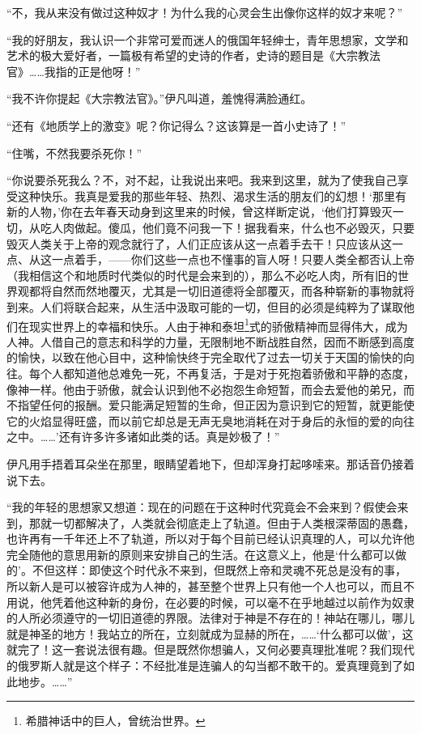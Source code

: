 \par “不，我从来没有做过这种奴才！为什么我的心灵会生出像你这样的奴才来呢？”
\par “我的好朋友，我认识一个非常可爱而迷人的俄国年轻绅士，青年思想家，文学和艺术的极大爱好者，一篇极有希望的史诗的作者，史诗的题目是《大宗教法官》……我指的正是他呀！”
\par “我不许你提起《大宗教法官》。”伊凡叫道，羞愧得满脸通红。
\par “还有《地质学上的激变》呢？你记得么？这该算是一首小史诗了！”
\par “住嘴，不然我要杀死你！”
\par “你说要杀死我么？不，对不起，让我说出来吧。我来到这里，就为了使我自己享受这种快乐。我真是爱我的那些年轻、热烈、渴求生活的朋友们的幻想！‘那里有新的人物，’你在去年春天动身到这里来的时候，曾这样断定说，‘他们打算毁灭一切，从吃人肉做起。傻瓜，他们竟不问我一下！据我看来，什么也不必毁灭，只要毁灭人类关于上帝的观念就行了，人们正应该从这一点着手去干！只应该从这一点、从这一点着手，——你们这些一点也不懂事的盲人呀！只要人类全都否认上帝（我相信这个和地质时代类似的时代是会来到的），那么不必吃人肉，所有旧的世界观都将自然而然地覆灭，尤其是一切旧道德将全部覆灭，而各种崭新的事物就将到来。人们将联合起来，从生活中汲取可能的一切，但目的必须是纯粹为了谋取他们在现实世界上的幸福和快乐。人由于神和泰坦\footnote{希腊神话中的巨人，曾统治世界。}式的骄傲精神而显得伟大，成为人神。人借自己的意志和科学的力量，无限制地不断战胜自然，因而不断感到高度的愉快，以致在他心目中，这种愉快终于完全取代了过去一切关于天国的愉快的向往。每个人都知道他总难免一死，不再复活，于是对于死抱着骄傲和平静的态度，像神一样。他由于骄傲，就会认识到他不必抱怨生命短暂，而会去爱他的弟兄，而不指望任何的报酬。爱只能满足短暂的生命，但正因为意识到它的短暂，就更能使它的火焰显得旺盛，而以前它却总是无声无臭地消耗在对于身后的永恒的爱的向往之中。……’还有许多许多诸如此类的话。真是妙极了！”
\par 伊凡用手捂着耳朵坐在那里，眼睛望着地下，但却浑身打起哆嗦来。那话音仍接着说下去。
\par “我的年轻的思想家又想道：现在的问题在于这种时代究竟会不会来到？假使会来到，那就一切都解决了，人类就会彻底走上了轨道。但由于人类根深蒂固的愚蠢，也许再有一千年还上不了轨道，所以对于每个目前已经认识真理的人，可以允许他完全随他的意思用新的原则来安排自己的生活。在这意义上，他是‘什么都可以做的’。不但这样：即使这个时代永不来到，但既然上帝和灵魂不死总是没有的事，所以新人是可以被容许成为人神的，甚至整个世界上只有他一个人也可以，而且不用说，他凭着他这种新的身份，在必要的时候，可以毫不在乎地越过以前作为奴隶的人所必须遵守的一切旧道德的界限。法律对于神是不存在的！神站在哪儿，哪儿就是神圣的地方！我站立的所在，立刻就成为显赫的所在，……‘什么都可以做’，这就完了！这一套说法很有趣。但是既然你想骗人，又何必要真理批准呢？我们现代的俄罗斯人就是这个样子：不经批准是连骗人的勾当都不敢干的。爱真理竟到了如此地步。……”
